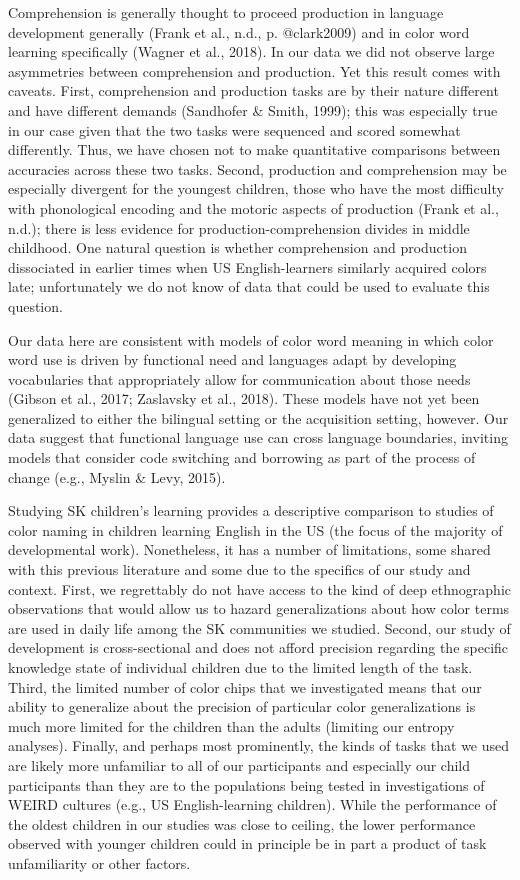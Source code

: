 \documentclass[
  english,
  ,man,floatsintext]{apa6}
\begin{document}
Comprehension is generally thought to proceed production in language development generally (Frank et al., n.d., p. @clark2009) and in color word learning specifically (Wagner et al., 2018). In our data we did not observe large asymmetries between comprehension and production. Yet this result comes with caveats. First, comprehension and production tasks are by their nature different and have different demands (Sandhofer \& Smith, 1999); this was especially true in our case given that the two tasks were sequenced and scored somewhat differently. Thus, we have chosen not to make quantitative comparisons between accuracies across these two tasks. Second, production and comprehension may be especially divergent for the youngest children, those who have the most difficulty with phonological encoding and the motoric aspects of production (Frank et al., n.d.); there is less evidence for production-comprehension divides in middle childhood. One natural question is whether comprehension and production dissociated in earlier times when US English-learners similarly acquired colors late; unfortunately we do not know of data that could be used to evaluate this question.

Our data here are consistent with models of color word meaning in which color word use is driven by functional need and languages adapt by developing vocabularies that appropriately allow for communication about those needs (Gibson et al., 2017; Zaslavsky et al., 2018). These models have not yet been generalized to either the bilingual setting or the acquisition setting, however. Our data suggest that functional language use can cross language boundaries, inviting models that consider code switching and borrowing as part of the process of change (e.g., Myslin \& Levy, 2015).

Studying SK children's learning provides a descriptive comparison to studies of color naming in children learning English in the US (the focus of the majority of developmental work). Nonetheless, it has a number of limitations, some shared with this previous literature and some due to the specifics of our study and context. First, we regrettably do not have access to the kind of deep ethnographic observations that would allow us to hazard generalizations about how color terms are used in daily life among the SK communities we studied. Second, our study of development is cross-sectional and does not afford precision regarding the specific knowledge state of individual children due to the limited length of the task. Third, the limited number of color chips that we investigated means that our ability to generalize about the precision of particular color generalizations is much more limited for the children than the adults (limiting our entropy analyses). Finally, and perhaps most prominently, the kinds of tasks that we used are likely more unfamiliar to all of our participants and especially our child participants than they are to the populations being tested in investigations of WEIRD cultures (e.g., US English-learning children). While the performance of the oldest children in our studies was close to ceiling, the lower performance observed with younger children could in principle be in part a product of task unfamiliarity or other factors.
\end{document}
